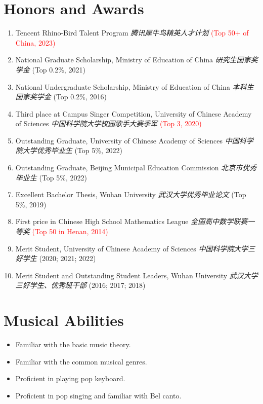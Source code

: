 \documentclass{resume}
\begin{document}
\section{Honors and Awards}
\begin{enumerate}
  \item Tencent Rhino-Bird Talent Program \textit{腾讯犀牛鸟精英人才计划} \textcolor{red}{(Top 50+ of China, 2023)}
  \item National Graduate Scholarship, Ministry of Education of China \textit{研究生国家奖学金}
        (Top 0.2\%, 2021)
  \item National Undergraduate Scholarship, Ministry of Education of China
        \textit{本科生国家奖学金} (Top 0.2\%, 2016)
  \item Third place at Campus Singer Competition, University of Chinese Academy of
        Sciences \textit{中国科学院大学校园歌手大赛季军} \textcolor{red}{(Top 3, 2020)}
  \item Outstanding Graduate, University of Chinese Academy of Sciences
        \textit{中国科学院大学优秀毕业生} (Top 5\%, 2022)
  \item Outstanding Graduate, Beijing Municipal Education Commission \textit{北京市优秀毕业生}
        (Top 5\%, 2022)
  \item Excellent Bachelor Thesis, Wuhan University \textit{武汉大学优秀毕业论文} (Top 5\%, 2019)
  \item First price in Chinese High School Mathematics League \textit{全国高中数学联赛一等奖} \textcolor{red}{(Top
        50 in Henan, 2014)}
  \item Merit Student, University of Chinese Academy of Sciences \textit{中国科学院大学三好学生}
        (2020; 2021; 2022)
  \item Merit Student and Outstanding Student Leaders, Wuhan University
        \textit{武汉大学三好学生、优秀班干部} (2016; 2017; 2018)
\end{enumerate}

\section{Musical Abilities}
\begin{itemize}
  \item Familiar with the basic music theory.
  \item Familiar with the common musical genres.
  \item Proficient in playing pop keyboard.
  \item Proficient in pop singing and familiar with Bel canto.
\end{itemize}

\end{document}
